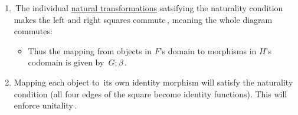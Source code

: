 \begin{enumerate}
    \item  \,The individual \hyperref[D3.49]{natural transformations} satsifying the naturality condition makes the left and right squares commute\,, meaning the whole diagram commutes: 
          \begin{itemize}
            \item Thus the mapping from objects in $F$'s domain to morphisms in $H$'s codomain is given by \,$G;\beta$\,.
          \end{itemize}
    \item Mapping each object to \,its own identity morphism will satisfy the naturality condition (all four edges of the square become identity functions). This will enforce unitality\,.
  \end{enumerate}
